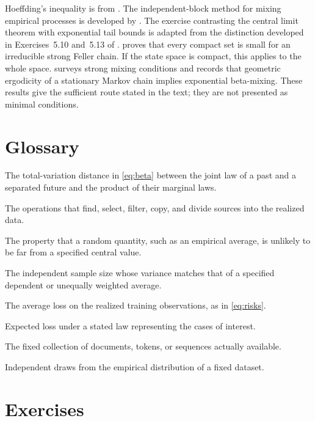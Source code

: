 \documentclass[11pt,twoside]{article}
\theoremstyle{definition}
\theoremstyle{remark}
\begin{document}
Hoeffding's inequality is from \citet{hoeffding1963}. The independent-block
method for mixing empirical processes is developed by \citet{yu1994}.
The exercise contrasting the central limit theorem with exponential tail
bounds is adapted from the distinction developed in Exercises~5.10 and~5.13 of
\citet{lattimore2020}.
\citet{hairer2002} proves that every compact set is small for an irreducible
strong Feller chain. If the state space is compact, this applies to the whole
space. \citet{bradley2005} surveys strong mixing conditions and records that
geometric ergodicity of a stationary Markov chain implies exponential
beta-mixing. These results give the sufficient route stated in the text; they
are not presented as minimal conditions.

\section*{Glossary}

\begin{description}[style=nextline,leftmargin=1.5em,labelindent=0pt]
\item[Absolute regularity or beta-mixing]
The total-variation distance in \cref{eq:beta} between the joint law of a past
and a separated future and the product of their marginal laws.
\item[Collection procedure]
The operations that find, select, filter, copy, and divide sources into the
realized data.
\item[Concentration]
The property that a random quantity, such as an empirical average, is unlikely
to be far from a specified central value.
\item[Effective sample size]
The independent sample size whose variance matches that of a specified
dependent or unequally weighted average.
\item[Empirical loss]
The average loss on the realized training observations, as in
\cref{eq:risks}.
\item[Population loss]
Expected loss under a stated law representing the cases of interest.
\item[Realized corpus]
The fixed collection of documents, tokens, or sequences actually available.
\item[Resampling with replacement]
Independent draws from the empirical distribution of a fixed dataset.
\end{description}

\section{Exercises}
\label{sec:exercises}
\end{document}
